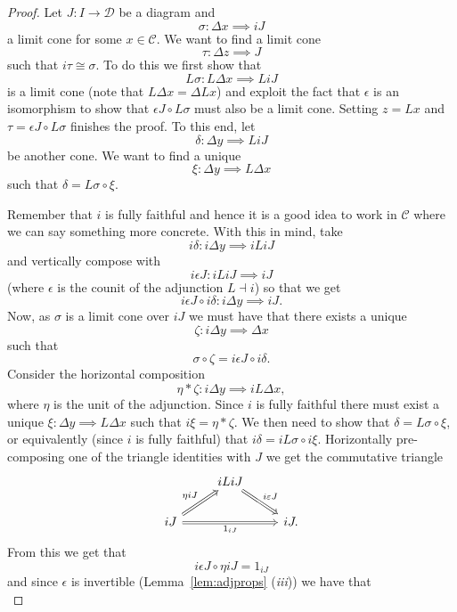 \begin{proof}
  Let $ J: I \to \mathcal{D} $ be a diagram and
  $$ \sigma: \Delta x \implies iJ $$
  a limit cone for some $ x \in \mathcal{C} $. We want to find a limit cone $$ \tau: \Delta z \implies J $$
  such that $ i\tau \cong \sigma $. To do this we first show that
  $$ L\sigma: L\Delta x \implies LiJ $$
  is a limit cone (note that $ L\Delta x = \Delta Lx $) and exploit the fact that $ \epsilon $ is an isomorphism to show that $ \epsilon J \circ L\sigma $ must also be a limit cone. Setting $ z = Lx $ and $ \tau = \epsilon J \circ L\sigma $ finishes the proof. To this end, let
  $$ \delta: \Delta y \implies LiJ $$
  be another cone. We want to find a unique
  $$ \xi: \Delta y \implies L\Delta x $$ such that $ \delta = L\sigma\circ \xi. $

  Remember that $ i $ is fully faithful and hence it is a good idea to work in $ \mathcal{C} $ where we can say something more concrete. With this in mind, take
  $$ i\delta: i\Delta y \implies iLiJ $$
  and vertically compose with
  $$ i\epsilon J: iLiJ \implies iJ $$
  (where $ \epsilon $ is the counit of the adjunction $ L \dashv i $) so that we get
  $$ i\epsilon J \circ i\delta: i\Delta y \implies iJ. $$
  Now, as $ \sigma $ is a limit cone over $ iJ $ we must have that there exists a unique
  $$ \zeta: i\Delta y \implies \Delta x $$
  such that
  $$ \sigma \circ \zeta = i\epsilon J \circ i\delta. $$
  Consider the horizontal composition
  $$ \eta * \zeta: i\Delta y \implies iL \Delta x, $$
  where $ \eta $ is the unit of the adjunction. Since $ i $ is fully faithful there must exist a unique $ \xi: \Delta y \implies L\Delta x $ such that $ i\xi = \eta * \zeta $. We then need to show that $ \delta = L\sigma \circ \xi $, or equivalently (since $ i $ is fully faithful) that $ i\delta = iL\sigma \circ i\xi $. Horizontally pre-composing one of the triangle identities with $ J $ we get the commutative triangle
  \[\begin{tikzcd}
	  & iLiJ \\
	  iJ && iJ.
	  \arrow["{1_{iJ}}"', Rightarrow, from=2-1, to=2-3]
	  \arrow["{\eta iJ}", Rightarrow, from=2-1, to=1-2]
	  \arrow["{i\varepsilon J}", Rightarrow, from=1-2, to=2-3]
  \end{tikzcd}\]
  From this we get that
  \begin{equation}
    i\epsilon J \circ \eta iJ = 1_{iJ}
  \end{equation}
  and since $ \epsilon $ is invertible (Lemma~\ref{lem:adjprops} (\textit{iii})) we have that
  \begin{equation}

\end{equation}
\end{proof}
